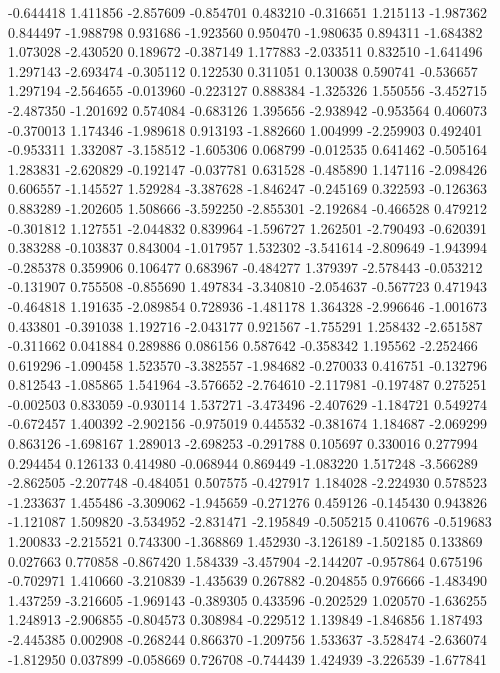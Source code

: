 -0.644418
1.411856
-2.857609
-0.854701
0.483210
-0.316651
1.215113
-1.987362
0.844497
-1.988798
0.931686
-1.923560
0.950470
-1.980635
0.894311
-1.684382
1.073028
-2.430520
0.189672
-0.387149
1.177883
-2.033511
0.832510
-1.641496
1.297143
-2.693474
-0.305112
0.122530
0.311051
0.130038
0.590741
-0.536657
1.297194
-2.564655
-0.013960
-0.223127
0.888384
-1.325326
1.550556
-3.452715
-2.487350
-1.201692
0.574084
-0.683126
1.395656
-2.938942
-0.953564
0.406073
-0.370013
1.174346
-1.989618
0.913193
-1.882660
1.004999
-2.259903
0.492401
-0.953311
1.332087
-3.158512
-1.605306
0.068799
-0.012535
0.641462
-0.505164
1.283831
-2.620829
-0.192147
-0.037781
0.631528
-0.485890
1.147116
-2.098426
0.606557
-1.145527
1.529284
-3.387628
-1.846247
-0.245169
0.322593
-0.126363
0.883289
-1.202605
1.508666
-3.592250
-2.855301
-2.192684
-0.466528
0.479212
-0.301812
1.127551
-2.044832
0.839964
-1.596727
1.262501
-2.790493
-0.620391
0.383288
-0.103837
0.843004
-1.017957
1.532302
-3.541614
-2.809649
-1.943994
-0.285378
0.359906
0.106477
0.683967
-0.484277
1.379397
-2.578443
-0.053212
-0.131907
0.755508
-0.855690
1.497834
-3.340810
-2.054637
-0.567723
0.471943
-0.464818
1.191635
-2.089854
0.728936
-1.481178
1.364328
-2.996646
-1.001673
0.433801
-0.391038
1.192716
-2.043177
0.921567
-1.755291
1.258432
-2.651587
-0.311662
0.041884
0.289886
0.086156
0.587642
-0.358342
1.195562
-2.252466
0.619296
-1.090458
1.523570
-3.382557
-1.984682
-0.270033
0.416751
-0.132796
0.812543
-1.085865
1.541964
-3.576652
-2.764610
-2.117981
-0.197487
0.275251
-0.002503
0.833059
-0.930114
1.537271
-3.473496
-2.407629
-1.184721
0.549274
-0.672457
1.400392
-2.902156
-0.975019
0.445532
-0.381674
1.184687
-2.069299
0.863126
-1.698167
1.289013
-2.698253
-0.291788
0.105697
0.330016
0.277994
0.294454
0.126133
0.414980
-0.068944
0.869449
-1.083220
1.517248
-3.566289
-2.862505
-2.207748
-0.484051
0.507575
-0.427917
1.184028
-2.224930
0.578523
-1.233637
1.455486
-3.309062
-1.945659
-0.271276
0.459126
-0.145430
0.943826
-1.121087
1.509820
-3.534952
-2.831471
-2.195849
-0.505215
0.410676
-0.519683
1.200833
-2.215521
0.743300
-1.368869
1.452930
-3.126189
-1.502185
0.133869
0.027663
0.770858
-0.867420
1.584339
-3.457904
-2.144207
-0.957864
0.675196
-0.702971
1.410660
-3.210839
-1.435639
0.267882
-0.204855
0.976666
-1.483490
1.437259
-3.216605
-1.969143
-0.389305
0.433596
-0.202529
1.020570
-1.636255
1.248913
-2.906855
-0.804573
0.308984
-0.229512
1.139849
-1.846856
1.187493
-2.445385
0.002908
-0.268244
0.866370
-1.209756
1.533637
-3.528474
-2.636074
-1.812950
0.037899
-0.058669
0.726708
-0.744439
1.424939
-3.226539
-1.677841
